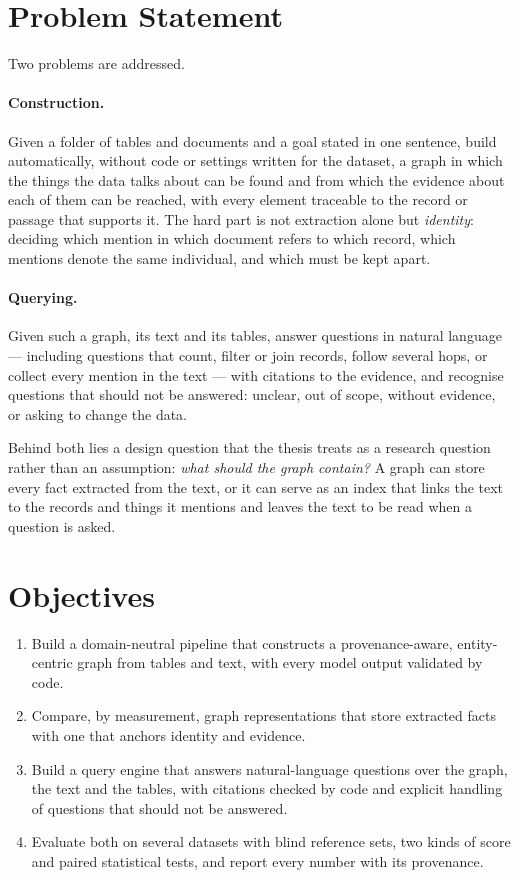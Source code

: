 \section{Problem Statement}\label{sec:ch01-problem-statement}

Two problems are addressed.

\paragraph{Construction.} Given a folder of tables and documents and a goal stated in one sentence, build
automatically, without code or settings written for the dataset, a graph in which the things the data talks about can
be found and from which the evidence about each of them can be reached, with every element traceable to the record or
passage that supports it. The hard part is not extraction alone but \emph{identity}: deciding which mention in which
document refers to which record, which mentions denote the same individual, and which must be kept apart.

\paragraph{Querying.} Given such a graph, its text and its tables, answer questions in natural language --- including
questions that count, filter or join records, follow several hops, or collect every mention in the text --- with
citations to the evidence, and recognise questions that should not be answered: unclear, out of scope, without
evidence, or asking to change the data.

Behind both lies a design question that the thesis treats as a research question rather than an assumption:
\emph{what should the graph contain?} A graph can store every fact extracted from the text, or it can serve as an index
that links the text to the records and things it mentions and leaves the text to be read when a question is asked.

\section{Objectives}\label{sec:ch01-objectives}

\begin{enumerate}[nosep]
\item Build a domain-neutral pipeline that constructs a provenance-aware, entity-centric graph from tables and text,
with every model output validated by code.
\item Compare, by measurement, graph representations that store extracted facts with one that anchors identity and
evidence.
\item Build a query engine that answers natural-language questions over the graph, the text and the tables, with
citations checked by code and explicit handling of questions that should not be answered.
\item Evaluate both on several datasets with blind reference sets, two kinds of score and paired statistical tests,
and report every number with its provenance.
\end{enumerate}

